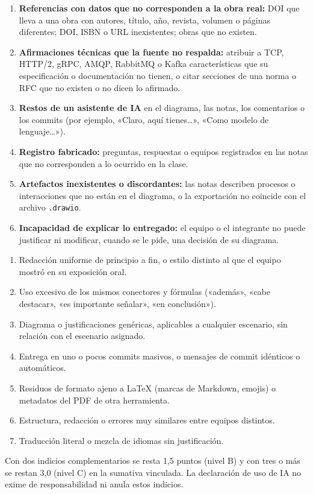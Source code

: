 \documentclass[11pt]{article}
\begin{document}
\begin{cajapiso}[title={Indicios graves de uso de IA: cada uno, por sí solo, implica CERO (P5)}]
	\begin{enumerate}[label=\textbf{G\arabic*.},leftmargin=24pt,itemsep=3pt]
		\item \textbf{Referencias con datos que no corresponden a la obra real:} DOI que lleva a una obra con autores, título, año, revista, volumen o páginas diferentes; DOI, ISBN o URL inexistentes; obras que no existen.
		\item \textbf{Afirmaciones técnicas que la fuente no respalda:} atribuir a TCP, HTTP/2, gRPC, AMQP, RabbitMQ o Kafka características que su especificación o documentación no tienen, o citar secciones de una norma o RFC que no existen o no dicen lo afirmado.
		\item \textbf{Restos de un asistente de IA} en el diagrama, las notas, los comentarios o los commits (por ejemplo, «Claro, aquí tienes\ldots», «Como modelo de lenguaje\ldots»).
		\item \textbf{Registro fabricado:} preguntas, respuestas o equipos registrados en las notas que no corresponden a lo ocurrido en la clase.
		\item \textbf{Artefactos inexistentes o discordantes:} las notas describen procesos o interacciones que no están en el diagrama, o la exportación no coincide con el archivo \texttt{.drawio}.
		\item \textbf{Incapacidad de explicar lo entregado:} el equipo o el integrante no puede justificar ni modificar, cuando se le pide, una decisión de su diagrama.
	\end{enumerate}
\end{cajapiso}

\begin{cajaaviso}[title={Indicios complementarios (se acumulan)}]
	\begin{enumerate}[label=\textbf{I\arabic*.},leftmargin=24pt,itemsep=3pt]
		\item Redacción uniforme de principio a fin, o estilo distinto al que el equipo mostró en su exposición oral.
		\item Uso excesivo de los mismos conectores y fórmulas («además», «cabe destacar», «es importante señalar», «en conclusión»).
		\item Diagrama o justificaciones genéricas, aplicables a cualquier escenario, sin relación con el escenario asignado.
		\item Entrega en uno o pocos commits masivos, o mensajes de commit idénticos o automáticos.
		\item Residuos de formato ajeno a \LaTeX{} (marcas de Markdown, emojis) o metadatos del PDF de otra herramienta.
		\item Estructura, redacción o errores muy similares entre equipos distintos.
		\item Traducción literal o mezcla de idiomas sin justificación.
	\end{enumerate}
	Con dos indicios complementarios se resta 1,5 puntos (nivel B) y con tres o más se restan 3,0 (nivel C) en la sumativa vinculada. La declaración de uso de IA no exime de responsabilidad ni anula estos indicios.
\end{cajaaviso}
\end{document}
